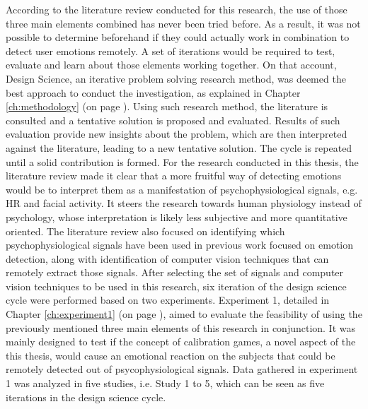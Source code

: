 According to the literature review conducted for this research, the use of those three main elements combined has never been tried before. As a result, it was not possible to determine beforehand if they could actually work in combination to detect user emotions remotely. A set of iterations would be required to test, evaluate and learn about those elements working together. On that account, Design Science, an iterative problem solving research method, was deemed the best approach to conduct the investigation, as explained in Chapter \ref{ch:methodology} (on page \pageref{ch:methodology}). Using such research method, the literature is consulted and a tentative solution is proposed and evaluated. Results of such evaluation provide new insights about the problem, which are then interpreted against the literature, leading to a new tentative solution. The cycle is repeated until a solid contribution is formed. For the research conducted in this thesis, the literature review made it clear that a more fruitful way of detecting emotions would be to interpret them as a manifestation of psychophysiological signals, e.g. HR and facial activity. It steers the research towards human physiology instead of psychology, whose interpretation is likely less subjective and more quantitative oriented. The literature review also focused on identifying which psychophysiological signals have been used in previous work focused on emotion detection, along with identification of computer vision techniques that can remotely extract those signals. After selecting the set of signals and computer vision techniques to be used in this research, six iteration of the design science cycle were performed based on two experiments. Experiment 1, detailed in Chapter \ref{ch:experiment1} (on page \pageref{ch:experiment1}), aimed to evaluate the feasibility of using the previously mentioned three main elements of this research in conjunction. It was mainly designed to test if the concept of calibration games, a novel aspect of the this thesis, would cause an emotional reaction on the subjects that could be remotely detected out of psycophysiological signals. Data gathered in experiment 1 was analyzed in five studies, i.e. Study 1 to 5, which can be seen as five iterations in the design science cycle.

